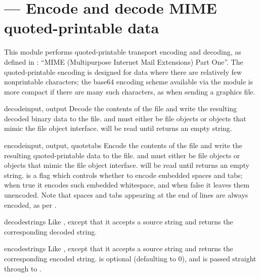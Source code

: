 \section{ ---
         Encode and decode MIME quoted-printable data}



This module performs quoted-printable transport encoding and decoding,
as defined in : ``MIME (Multipurpose Internet Mail Extensions)
Part One''.  The quoted-printable encoding is designed for data where
there are relatively few nonprintable characters; the base64 encoding
scheme available via the  module is more compact if there
are many such characters, as when sending a graphics file.


\begin{funcdesc}{decode}{input, output}
Decode the contents of the  file and write the resulting
decoded binary data to the  file.
 and  must either be file objects or objects that
mimic the file object interface.  will be read until
 returns an empty string.
\end{funcdesc}

\begin{funcdesc}{encode}{input, output, quotetabs}
Encode the contents of the  file and write the resulting
quoted-printable data to the  file.
 and  must either be file objects or objects that
mimic the file object interface.  will be read until
 returns an empty string.
 is a flag which controls whether to encode embedded
spaces and tabs; when true it encodes such embedded whitespace, and
when false it leaves them unencoded.  Note that spaces and tabs
appearing at the end of lines are always encoded, as per .
\end{funcdesc}

\begin{funcdesc}{decodestring}{s}
Like , except that it accepts a source string and
returns the corresponding decoded string.
\end{funcdesc}

\begin{funcdesc}{encodestring}{s}
Like , except that it accepts a source string and
returns the corresponding encoded string.   is optional
(defaulting to 0), and is passed straight through to
.
\end{funcdesc}


\begin{seealso}
\end{seealso}
